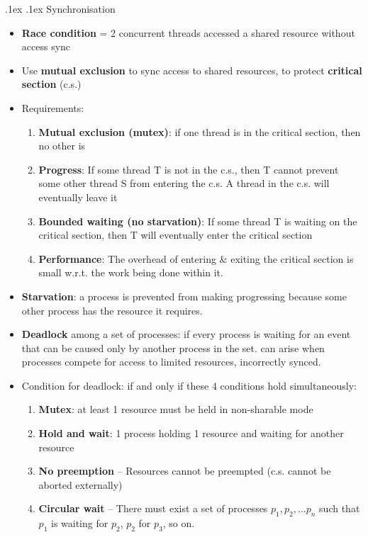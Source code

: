 \documentclass[10pt,landscape,a4paper]{article}
\makeatletter
\renewcommand{\subsection}{\@startsection{subsection}{1}{0mm}%
  {.1ex}%
  {.1ex}%
{\sffamily\bfseries}}
\makeatother
\begin{document}
\begin{multicols*}{4}
  \subsection{Synchronisation}
  \begin{itemize}
    \item \textbf{Race condition} = 2 concurrent threads accessed a shared resource without access sync
    \item Use \textbf{mutual exclusion} to sync access to shared resources, to protect \textbf{critical section} (c.s.)
    \item Requirements:
    \begin{enumerate}
      \item \textbf{Mutual exclusion (mutex)}: if one thread is in the critical section, then no other is
      \item \textbf{Progress}: If some thread T is not in the c.s., then T cannot prevent some other thread S from entering the c.s. A thread in the c.s. will eventually leave it
      \item \textbf{Bounded waiting (no starvation)}: If some thread T is waiting on the critical section, then T will eventually enter the critical section
      \item \textbf{Performance}: The overhead of entering \& exiting the critical section is small w.r.t. the work being done within it.
    \end{enumerate}
    \item \textbf{Starvation}: a process is prevented from making progressing because some other process has the resource it requires.
    \item \textbf{Deadlock} among a set of processes: if every process is waiting for an event that can be caused only by another process in the set. can arise when processes compete for access to limited resources, incorrectly synced.
    \item Condition for deadlock: if and only if these 4 conditions hold simultaneously:
    \begin{enumerate}
      \item \textbf{Mutex}: at least 1 resource must be held in non-sharable mode
      \item \textbf{Hold and wait}: 1 process holding 1 resource and waiting for another resource
      \item \textbf{No preemption} -- Resources cannot be preempted (c.s. cannot be aborted externally)
      \item \textbf{Circular wait} -- There must exist a set of processes $p_1, p_2, ... p_n$ such that $p_1$ is waiting for $p_2$, $p_2$ for $p_3$, so on.

\end{enumerate}
\end{itemize}
\end{multicols*}
\end{document}
